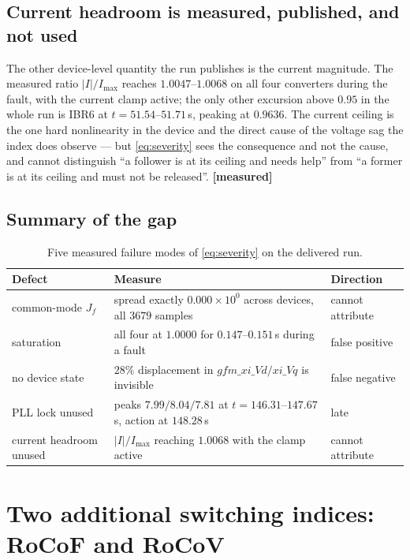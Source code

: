 \documentclass[12pt,a4paper]{article}
\theoremstyle{remark}
\newcommand{\measured}{\textcolor{ok}{\textbf{[measured]}}}
\begin{document}
\subsection{Current headroom is measured, published, and not used}

The other device-level quantity the run publishes is the current magnitude. The
measured ratio $|I|/I_{\max}$ reaches $1.0047$--$1.0068$ on all four converters
during the fault, with the current clamp active; the only other excursion above
$0.95$ in the whole run is IBR6 at $t = 51.54$--$51.71$\,s, peaking at $0.9636$.
The current ceiling is the one hard nonlinearity in the device and the direct
cause of the voltage sag the index does observe --- but \eqref{eq:severity} sees
the consequence and not the cause, and cannot distinguish ``a follower is at its
ceiling and needs help'' from ``a former is at its ceiling and must not be
released''. \measured{}

\subsection{Summary of the gap}

\begin{table}[H]
\centering
\small
\begin{tabularx}{\textwidth}{@{}lXl@{}}
\toprule
\textbf{Defect} & \textbf{Measure} & \textbf{Direction}\\
\midrule
common-mode $J_f$ & spread exactly $0.000\times10^{0}$ across devices, all $3679$ samples & cannot attribute\\
saturation & all four at $1.0000$ for $0.147$--$0.151$\,s during a fault & false positive\\
no device state & $28\%$ displacement in $gfm\_xi\_Vd/xi\_Vq$ is invisible & false negative\\
PLL lock unused & peaks $7.99/8.04/7.81$ at $t=146.31$--$147.67$\,s, action at $148.28$\,s & late\\
current headroom unused & $|I|/I_{\max}$ reaching $1.0068$ with the clamp active & cannot attribute\\
\bottomrule
\end{tabularx}
\caption{Five measured failure modes of \eqref{eq:severity} on the delivered run.}
\label{tab:gaps}
\end{table}

\section{Two additional switching indices: RoCoF and RoCoV}\label{sec:newindices}
\end{document}

